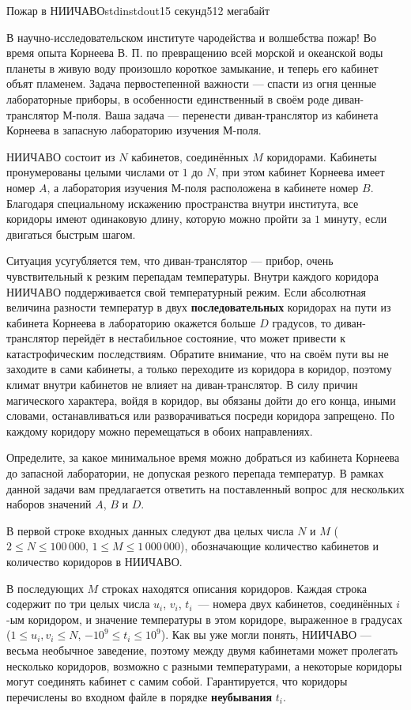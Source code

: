 \begin{problem}{Пожар в НИИЧАВО}{stdin}{stdout}{15 секунд}{512 мегабайт}

В научно-исследовательском институте чародейства и волшебства пожар! Во время опыта Корнеева В. П. по превращению всей морской и океанской воды планеты в живую воду произошло короткое замыкание, и теперь его кабинет объят пламенем. Задача первостепенной важности --- спасти из огня ценные лабораторные приборы, в особенности единственный в своём роде диван-транслятор М-поля. Ваша задача --- перенести диван-транслятор из кабинета Корнеева в запасную лабораторию изучения М-поля.

НИИЧАВО состоит из $N$ кабинетов, соединённых $M$ коридорами. Кабинеты пронумерованы целыми числами от $1$ до $N$, при этом кабинет Корнеева имеет номер $A$, а лаборатория изучения М-поля расположена в кабинете номер $B$. Благодаря специальному искажению пространства внутри института, все коридоры имеют одинаковую длину, которую можно пройти за $1$ минуту, если двигаться быстрым шагом.

Ситуация усугубляется тем, что диван-транслятор --- прибор, очень чувствительный к резким перепадам температуры. Внутри каждого коридора НИИЧАВО поддерживается свой температурный режим. Если абсолютная величина разности температур в двух \textbf{последовательных} коридорах на пути из кабинета Корнеева в лабораторию окажется больше $D$ градусов, то диван-транслятор перейдёт в нестабильное состояние, что может привести к катастрофическим последствиям. Обратите внимание, что на своём пути вы не заходите в сами кабинеты, а только переходите из коридора в коридор, поэтому климат внутри кабинетов не влияет на диван-транслятор. В силу причин магического характера, войдя в коридор, вы обязаны дойти до его конца, иными словами, останавливаться или разворачиваться посреди коридора запрещено. По каждому коридору можно перемещаться в обоих направлениях.

Определите, за какое минимальное время можно добраться из кабинета Корнеева до запасной лаборатории, не допуская резкого перепада температур. В рамках данной задачи вам предлагается ответить на поставленный вопрос для нескольких наборов значений $A$, $B$ и $D$.

\InputFile
В первой строке входных данных следуют два целых числа $N$ и $M$ ($2 \leq N \leq 100\,000$, $1 \leq M \leq 1\,000\,000$), обозначающие количество кабинетов и количество коридоров в НИИЧАВО.

В последующих $M$ строках находятся описания коридоров. Каждая строка содержит по три целых числа $u_i$, $v_i$, $t_i$~--- номера двух кабинетов, соединённых $i$-ым коридором, и значение температуры в этом коридоре, выраженное в градусах ($1 \leq u_i, v_i \leq N$, $-10^9 \leq t_i \leq 10^9$). Как вы уже могли понять, НИИЧАВО --- весьма необычное заведение, поэтому между двумя кабинетами может пролегать несколько коридоров, возможно с разными температурами, а некоторые коридоры могут соединять кабинет с самим собой. Гарантируется, что коридоры перечислены во входном файле в порядке \textbf{неубывания} $t_i$.


\end{problem}
